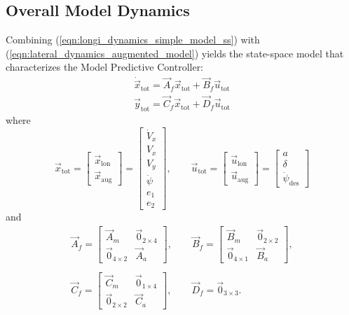 \subsection{Overall Model Dynamics}
Combining (\ref{eqn:longi_dynamics_simple_model_ss}) with (\ref{eqn:lateral_dynamics_augmented_model}) yields the state-space model that characterizes the Model Predictive Controller:
\begin{equation}
\label{eqn:full_dynamics_model}
\begin{array}{ll}
\dot{\vec{x}}_{\text{tot}} = \vec{A}_f \vec{x}_{\text{tot}}+ \vec{B}_f \vec{u}_{\text{tot}}\\
\vec{y}_{\text{tot}} = \vec{C}_f \vec{x}_{\text{tot}} + \vec{D}_f \vec{u}_{\text{tot}}
\end{array}
\end{equation}
where
\begin{equation}
\vec{x}_{\text{tot}} = \begin{bmatrix}
\vec{x}_{\text{lon}}\\\vec{x}_{\text{aug}}
\end{bmatrix} = \begin{bmatrix}
\dot{V}_x\\V_x\\V_y\\\dot{\psi}\\e_1\\e_2
\end{bmatrix},
\qquad
\vec{u}_{\text{tot}} = \begin{bmatrix}
\vec{u}_{\text{lon}}\\\vec{u}_{\text{aug}}
\end{bmatrix}  =
\begin{bmatrix}
a\\\delta\\\dot{\psi}_{\text{des}}
\end{bmatrix}
\end{equation}
and
\begin{equation}
\begin{array}{cc}
\vec{A}_f=\begin{bmatrix}
\vec{A}_m&\vec{0}_{2\times4}\\
\vec{0}_{4\times2}&\vec{A}_a
\end{bmatrix},
\qquad
\vec{B}_f=\begin{bmatrix}
\vec{B}_m&\vec{0}_{2\times2}\\
\vec{0}_{4\times1}&\vec{B}_a
\end{bmatrix},
\\\\
\vec{C}_f=\begin{bmatrix}
\vec{C}_m&\vec{0}_{1\times4}\\
\vec{0}_{2\times2}&\vec{C}_a
\end{bmatrix}, 
\qquad
\vec{D}_f=\vec{0}_{3\times3}. 
\end{array}
\end{equation} 

